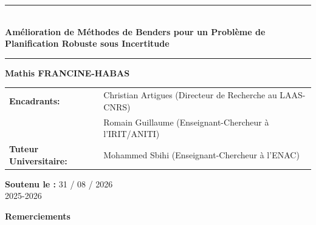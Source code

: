 \documentclass[12pt, a4paper, twoside]{report}
\begin{document}
\begin{titlepage}
    \vspace{2.5cm}

    \begin{center}
        {\color{mainblue}\rule{\textwidth}{2pt}} \\[0.6cm]
        {\sffamily \Huge \bfseries Amélioration de Méthodes de Benders pour un Problème de Planification Robuste sous Incertitude} \\[0.4cm] 
        {\color{mainblue}\rule{\textwidth}{2pt}}
    \end{center}

    \vspace{1.5cm}

    \begin{center}
        {\Large \textbf{Mathis FRANCINE-HABAS}} \\[1cm]
        
        \begin{tabular}{ll}
            \textbf{Encadrants:} & Christian Artigues \hfill (Directeur de Recherche au LAAS-CNRS) \\
                                  & Romain Guillaume \hfill (Enseignant-Chercheur à l'IRIT/ANITI) \\[0.3cm]
            \textbf{Tuteur Universitaire:} & Mohammed Sbihi \hfill (Enseignant-Chercheur à l’ENAC)
        \end{tabular}
    \end{center}

    \vfill

    \begin{center}
        {\large \textbf{Soutenu le :} 31 / 08 / 2026} \\
        \vspace{0.2cm}
        {\large 2025-2026}
    \end{center}
\end{titlepage}


\clearpage
{} 
\thispagestyle{empty}

\vspace*{\fill}

\begin{center}
    {\sffamily \Huge \bfseries \textcolor{mainblue}{Remerciements}} \\[1.5cm]
\end{center}
\end{document}
